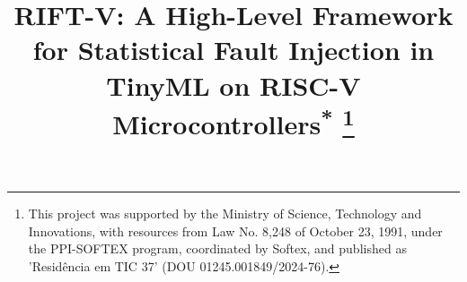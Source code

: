 \documentclass[conference]{IEEEtran}
\begin{document}
\title{RIFT-V: A High-Level Framework for Statistical Fault Injection in TinyML on RISC-V Microcontrollers{\footnotesize \textsuperscript{*}}%
\thanks{This project was supported by the Ministry of Science, Technology and Innovations, with resources from Law No. 8,248 of October 23, 1991, under the PPI-SOFTEX program, coordinated by Softex, and published as 'Residência em TIC 37' (DOU 01245.001849/2024-76).}
}

%
\author{\IEEEauthorblockN{}
\IEEEauthorblockA{\textit{}}
}


\maketitle
\end{document}
